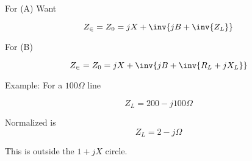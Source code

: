 
For (A)
Want 

\begin{equation}\label{eqn:uwavesDeck6LCmatchingCore:n}
Z_\in = Z_0 = j X + \inv{ j B + \inv{Z_L} }
\end{equation}


For (B) 

\begin{equation}\label{eqn:uwavesDeck6LCmatchingCore:n}
Z_\in = Z_0 = j X + \inv{ j B + \inv{R_L + j X_L} }
\end{equation}

Example: For a \( 100 \Omega \) line

\begin{equation}\label{eqn:uwavesDeck6LCmatchingCore:n}
Z_L = 200 -j 100 \Omega 
\end{equation}

Normalized is
\begin{equation}\label{eqn:uwavesDeck6LCmatchingCore:n}
Z_L = 2 -j \Omega 
\end{equation}

This is outside the \( 1 + j X \) circle.



